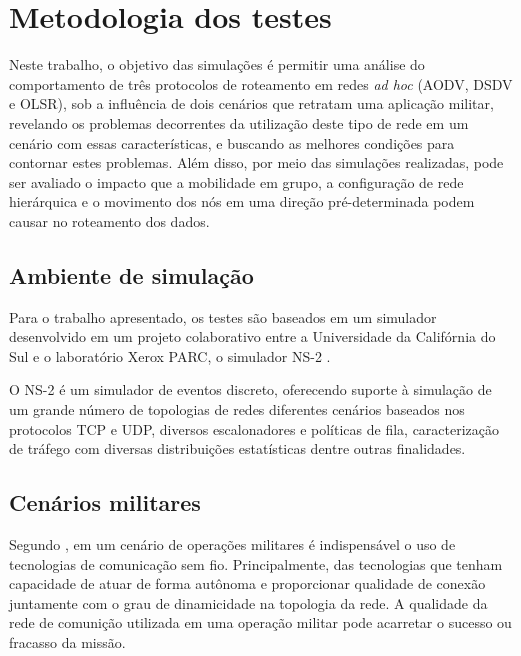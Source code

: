 \section{Metodologia dos testes}\label{metodologia}
Neste trabalho, o objetivo das simula\c{c}\~oes \'e permitir uma an\'alise do comportamento de tr\^es protocolos de roteamento em redes \textit{ad hoc} (AODV, DSDV e OLSR), sob a influ\^encia de dois cen\'arios que retratam uma aplica\c{c}\~ao militar, revelando os problemas decorrentes da utiliza\c{c}\~ao deste tipo de rede em um cen\'ario com essas caracter\'isticas, e buscando as melhores condi\c{c}\~oes para contornar estes problemas. 
Al\'em disso, por meio das simula\c{c}\~oes realizadas, pode ser avaliado o impacto que a mobilidade em grupo, a configura\c{c}\~ao de rede hier\'arquica e o movimento dos n\'os em uma dire\c{c}\~ao pr\'e-determinada podem causar no roteamento dos dados.

\subsection{Ambiente de simula\c{c}\~ ao}
Para o trabalho apresentado, os testes s\~ao baseados em um simulador desenvolvido em um projeto colaborativo entre a Universidade da Calif\'ornia do Sul e o laborat\'orio Xerox PARC, o simulador NS-2 \cite{FallVaradhan}.

O NS-2 \'e um simulador de eventos discreto, oferecendo suporte \`a simula\c{c}\~ao de um grande n\'umero de topologias de redes diferentes cen\'arios baseados nos protocolos TCP e UDP, diversos escalonadores e pol\'iticas de fila, caracteriza\c{c}\~ao de tr\'afego com diversas distribui\c{c}\~oes estat\'isticas dentre outras finalidades.

\subsection{Cen\'arios militares}
Segundo \cite{pereira}, em um cen\'ario de opera\c{c}\~oes militares \'e indispens\'avel o uso de tecnologias de comunica\c{c}\~ao sem fio. 
Principalmente, das tecnologias que tenham capacidade de atuar de forma aut\^onoma e proporcionar qualidade de conex\~ao juntamente com o grau de dinamicidade na topologia da rede.
A qualidade da rede de comuni\c{c}\~ao utilizada em uma opera\c{c}\~ao militar pode acarretar o sucesso ou fracasso da miss\~ao.

